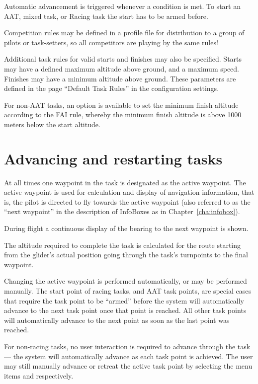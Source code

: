 Automatic advancement is triggered whenever a condition is met. To start an AAT,
mixed task, or Racing task the start has to be armed before.

\tip Competition rules may be defined in a profile file for
distribution to a group of pilots or task-setters, so all competitors
are playing by the same rules!

Additional task rules for valid starts and finishes may also be
specified.  Starts may have a defined maximum altitude above ground,
and a maximum speed.  Finishes may have a minimum altitude above
ground.  These parameters are defined in the page ``Default Task Rules'' in
the configuration  settings.

For non-AAT tasks, an option is available to set the minimum finish
altitude according to the FAI rule, whereby the minimum finish
altitude is above 1000 meters below the start altitude.




\section{Advancing and restarting tasks}\label{sec:advanc-rest-tasks}
At all times one waypoint in the task is designated as the active
waypoint.  The active waypoint is used for calculation and display of
navigation information, that is, the pilot is directed to fly towards
the active waypoint (also referred to as the ``next waypoint'' in the
description of InfoBoxes as in Chapter~\ref{cha:infobox}).

During flight a continuous display of the bearing to the next waypoint is shown.

The altitude required to complete the task is calculated for the route starting
from the glider's actual position going through the task's turnpoints to the
final waypoint.

Changing the active waypoint is performed automatically, or may be performed manually.
The start point of racing tasks, and AAT task points, are special cases that require
the task point to be ``armed'' before the system will automatically advance to the next
task point once that point is reached.  All other task points will automatically
advance to the next point as soon as the last point was reached.

For non-racing tasks, no user interaction is required to
advance through the task --- the system will automatically advance as
each task point is achieved.  The user may still manually advance or retreat the active
task point by selecting the menu items \blink{} and
\blink{} respectively.

